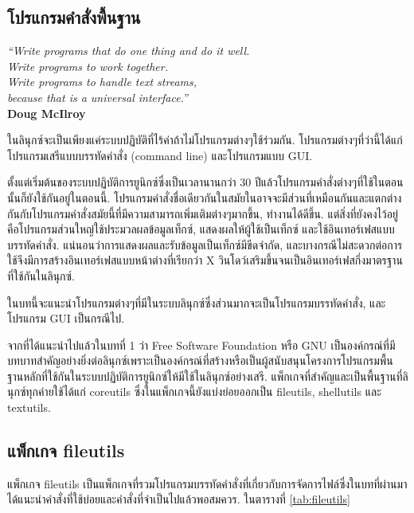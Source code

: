 \begin{thwbr}
\chapter{โปรแกรมคำสั่งพื้นฐาน}
\begin{flushright}
{\it\latintext ``Write programs that do one thing and do it well.\\
Write programs to work together. \\
Write programs to handle text streams, \\
because that is a universal interface.''}\\
{{\bf\latintext  Doug McIlroy}}
\end{flushright}

ในลินุกซ์จะเป็นเพียงแค่ระบบปฏิบัติที่ไร้ค่าถ้าไม่โปรแกรมต่างๆใช้ร่วมกัน. โปรแกรมต่างๆที่ว่านี้ได้แก่โปรแกรมเสรีแบบบรรทัดคำสั่ง (command line) และโปรแกรมแบบ GUI. 

ตั้งแต่เริ่มต้นของระบบปฏิบัติการยูนิกซ์ซึ่งเป็นเวลานานกว่า 30 ปีแล้วโปรแกรมคำสั่งต่างๆที่ใช้ในตอนนั้นก็ยังใช้กันอยู่ในตอนนี้. โปรแกรมคำสั่งชื่อเดียวกันในสมัยในอาจจะมีส่วนที่เหมือนกันและแตกต่างกันกับโปรแกรมคำสั่งสมัยนี้ที่มีความสามารถเพิ่มเติมต่างๆมากขึ้น, ทำงานได้ดีขึ้น. แต่สิ่งที่ยังคงไว้อยู่คือโปรแกรมส่วนใหญ่ใช้ประมวลผลข้อมูลเท็กซ์, แสดงผลให้ผู้ใช้เป็นเท็กซ์ และใช้อินเทอร์เฟสแบบบรรทัดคำสั่ง. แน่นอนว่าการแสดงผลและรับข้อมูลเป็นเท็กซ์มีขีดจำกัด, และบางกรณีไม่สะดวกต่อการใช้จึงมีการสร้างอินเทอร์เฟสแบบหน้าต่างที่เรียกว่า X วินโดว์เสริมขึ้นจนเป็นอินเทอร์เฟสกึ่งมาตรฐานที่ใช้กันในลินุกซ์. 

ในบทนี้จะแนะนำโปรแกรมต่างๆที่มีในระบบลินุกซ์ซึ่งส่วนมากจะเป็นโปรแกรมบรรทัดคำสั่ง, และโปรแกรม GUI เป็นกรณีไป.

\medskip
จากที่ได้แนะนำไปแล้วในบทที่ 1 ว่า Free Software Foundation หรือ GNU เป็นองค์กรณ์ที่มีบทบาทสำคัญอย่างยิ่งต่อลินุกซ์เพราะเป็นองค์กรณ์ที่สร้างหรือเป็นผู้สนับสนุนโครงการโปรแกรมพื้นฐานหลักที่ใช้กันในระบบปฏิบัติการยูนิกซ์ให้มีใช้ในลินุกซ์อย่างเสรี. แพ็กเกจที่สำคัญและเป็นพื้นฐานที่ลินุกซ์ทุกค่ายใช้ได้แก่ coreutils ซึ่งในแพ็กเกจนี้ยังแบ่งย่อยออกเป็น fileutils, shellutils และ textutils. 

\section{แพ็กเกจ fileutils}
แพ็กเกจ fileutils เป็นแพ็กเกจที่รวมโปรแกรมบรรทัดคำสั่งที่เกี่ยวกับการจัดการไฟล์ซึ่งในบทที่ผ่านมาได้แนะนำคำสั่งที่ใช้บ่อยและคำสั่งที่จำเป็นไปแล้วพอสมควร. ในตารางที่ \ref{tab:fileutils}


\end{thwbr}
